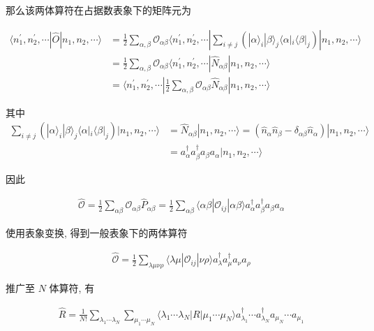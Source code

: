 \documentclass[../../main.tex]{subfiles}
\begin{document}
那么该两体算符在占据数表象下的矩阵元为

\begin{align*}
  \langle n_{1}^{\prime}, n_{2}^{\prime},\cdots|\hat{O}|n_{1},n_{2},\cdots\rangle &= \frac{1}{2}\sum_{\alpha,\beta}\mathcal{O}_{\alpha\beta}\langle n_{1}^{\prime}, n_{2}^{\prime},\cdots|\sum_{i\neq j}(|\alpha\rangle_{i}|\beta\rangle_{j}\langle\alpha|_{i}\langle\beta|_{j})|n_{1},n_{2},\cdots\rangle\\
&= \frac{1}{2}\sum_{\alpha,\beta}\mathcal{O}_{\alpha\beta}\langle n_{1}^{\prime}, n_{2}^{\prime},\cdots|\hat{N}_{\alpha\beta}|n_{1},n_{2},\cdots\rangle\\
&= \langle n_{1}^{\prime}, n_{2}^{\prime},\cdots|\frac{1}{2}\sum_{\alpha,\beta}\mathcal{O}_{\alpha\beta}\hat{N}_{\alpha\beta}|n_{1},n_{2},\cdots\rangle
\end{align*}

其中 $\begin{aligned}
  \sum_{i\neq j}(|\alpha\rangle_{i}|\beta\rangle_{j}\langle\alpha|_{i}\langle\beta|_{j})|n_{1},n_{2},\cdots\rangle &= \hat{N}_{\alpha\beta}|n_{1},n_{2},\cdots\rangle = \left(\hat{n}_{\alpha}\hat{n}_{\beta} - \delta_{\alpha\beta}\hat{n}_{\alpha}\right)|n_{1},n_{2},\cdots\rangle\\
  &= a_{\alpha}^{\dagger}a_{\beta}^{\dagger}a_{\beta}a_{\alpha}|n_{1},n_{2},\cdots\rangle
\end{aligned}$

因此

\begin{align*}
  \hat{\mathcal{O}} = \frac{1}{2}\sum_{\alpha\beta}\mathcal{O}_{\alpha\beta}\hat{P}_{\alpha\beta} = \frac{1}{2}\sum_{\alpha\beta}\langle\alpha\beta|\mathcal{O}_{ij}|\alpha\beta\rangle a_{\alpha}^{\dagger}a_{\beta}^{\dagger}a_{\beta}a_{\alpha}
\end{align*}

使用表象变换, 得到一般表象下的两体算符

\begin{align*}
  \hat{\mathcal{O}} = \frac{1}{2}\sum_{\lambda\mu\nu\rho}\langle\lambda\mu|\mathcal{O}_{ij}|\nu\rho\rangle a_{\lambda}^{\dagger}a_{\mu}^{\dagger}a_{\nu}a_{\rho}
\end{align*}

推广至 $N$ 体算符, 有

\begin{align*}
  \hat{R} = \frac{1}{N!}\sum_{\lambda_{1}\cdots\lambda_{N}}\sum_{\mu_{1}\cdots\mu_{N}}\langle\lambda_{1}\cdots\lambda_{N}|R|\mu_{1}\cdots\mu_{N}\rangle a_{\lambda_{1}}^{\dagger}\cdots a_{\lambda_{N}}^{\dagger} a_{\mu_{N}}\cdots a_{\mu_{1}}
\end{align*}
\end{document}
